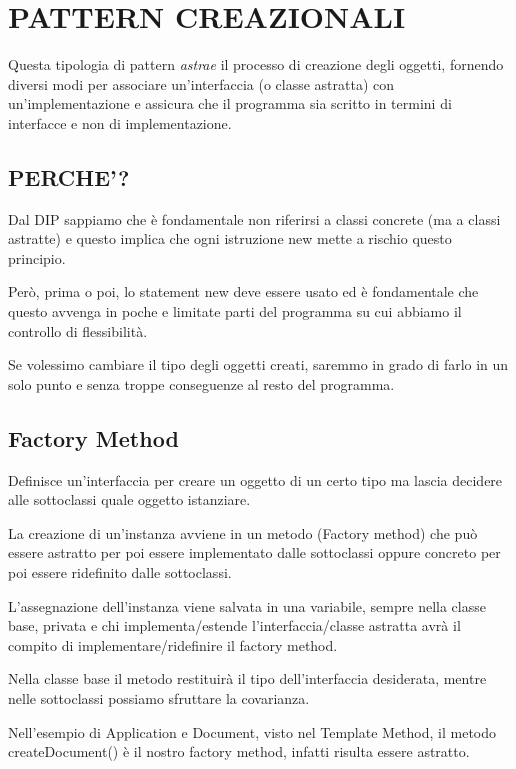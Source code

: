 \chapter{PATTERN CREAZIONALI}

Questa tipologia di pattern \textit{astrae} il processo di creazione degli oggetti, fornendo diversi modi per associare un’interfaccia (o classe astratta) con 
un’implementazione e assicura che il programma sia scritto in termini di interfacce e non di implementazione.

\section{PERCHE'?}

Dal DIP sappiamo che è fondamentale non riferirsi a classi concrete (ma a classi astratte) e questo implica che ogni istruzione new mette a rischio questo principio.

Però, prima o poi, lo statement new deve essere usato ed è fondamentale che questo avvenga in poche e limitate parti del programma su cui abbiamo il controllo di 
flessibilità.

Se volessimo cambiare il tipo degli oggetti creati, saremmo in grado di farlo in un solo punto e senza troppe conseguenze al resto del programma.

\section{Factory Method}

Definisce un’interfaccia per creare un oggetto di un certo tipo ma lascia decidere alle sottoclassi quale oggetto istanziare.

La creazione di un'instanza avviene in un metodo (Factory method) che può essere astratto per poi essere implementato dalle sottoclassi oppure concreto per poi 
essere ridefinito dalle sottoclassi.

L'assegnazione dell'instanza viene salvata in una variabile, sempre nella classe base, privata e chi implementa/estende l'interfaccia/classe astratta avrà il compito 
di implementare/ridefinire il factory method.

Nella classe base il metodo restituirà il tipo dell'interfaccia desiderata, mentre nelle sottoclassi possiamo sfruttare la covarianza.

Nell'esempio di Application e Document, visto nel Template Method, il metodo createDocument() è il nostro factory method, infatti risulta essere astratto.

